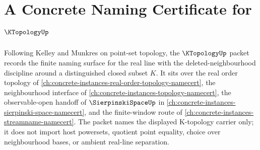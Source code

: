 \chapter{A Concrete Naming Certificate for $\KTopologyUp$}
\label{ch:concrete-instances-k-topology-namecert}

Following Kelley and Munkres on point-set topology, the $\KTopologyUp$ packet records the finite naming surface for the real line with the deleted-neighbourhood discipline around a distinguished closed subset $K$. It sits over the real order topology of \autoref{ch:concrete-instances-real-order-topology-namecert}, the neighbourhood interface of \autoref{ch:concrete-instances-topology-namecert}, the observable-open handoff of $\SierpinskiSpaceUp$ in \autoref{ch:concrete-instances-sierpinski-space-namecert}, and the finite-window route of \autoref{ch:concrete-instances-streamname-namecert}. The packet names the displayed K-topology carrier only; it does not import host powersets, quotient point equality, choice over neighbourhood bases, or ambient real-line separation.

